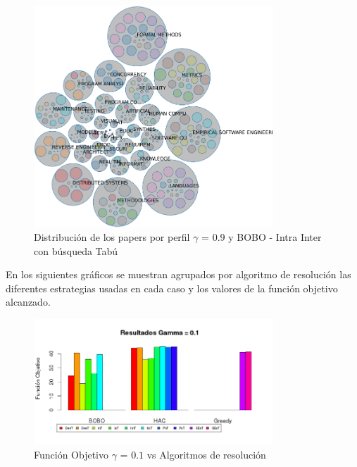\begin{figure}[H]
  \centering
    \includegraphics[width=0.8\textwidth]{resultados/papers/BOBO/INTRA_INTER/bubbles-gamma-with-local-09.png}
  \caption{Distribución de los papers por perfil $\gamma$ = $0.9$ y BOBO - Intra Inter con búsqueda Tabú}
  \label{res:img-papers-bubbles-gamma09-hac-intra-inter-bobo}
\end{figure}

En los siguientes gráficos se muestran agrupados por algoritmo de resolución las diferentes estrategias usadas en cada caso y los valores de la función objetivo alcanzado.

\begin{figure}[H]
  \centering
    \includegraphics[width=0.8\textwidth]{resultados/papers/Graficos_agrupados/gamma01.png}
  \caption{Función Objetivo $\gamma$ = $0.1$ vs Algoritmos de resolución}
  \label{res:img-papers-agr-gamma01}
\end{figure}

